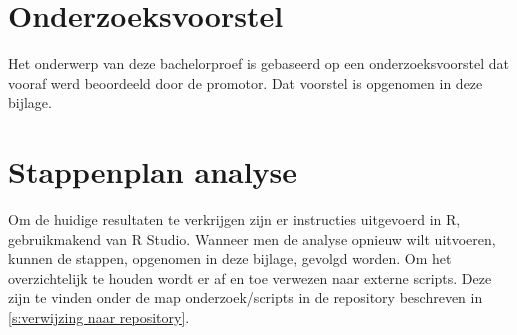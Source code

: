 \documentclass[fleqn,a4paper,12pt]{book}
\begin{document}
\chapter{Onderzoeksvoorstel}
\label{apendix:onderzoeksvoorstel}
Het onderwerp van deze bachelorproef is gebaseerd op een onderzoeksvoorstel dat vooraf werd beoordeeld door de promotor. Dat voorstel is opgenomen in deze bijlage.




\chapter{Stappenplan analyse}
\label{appendix:stappenplan analyse}

Om de huidige resultaten te verkrijgen zijn er instructies uitgevoerd in R, gebruikmakend van R Studio. Wanneer men de analyse opnieuw wilt uitvoeren, kunnen de stappen, opgenomen in deze bijlage, gevolgd worden. Om het overzichtelijk te houden wordt er af en toe verwezen naar externe scripts. Deze zijn te vinden onder de map onderzoek/scripts in de repository beschreven in \ref{s:verwijzing naar repository}.



\printbibliography[heading=bibintoc]
\end{document}
